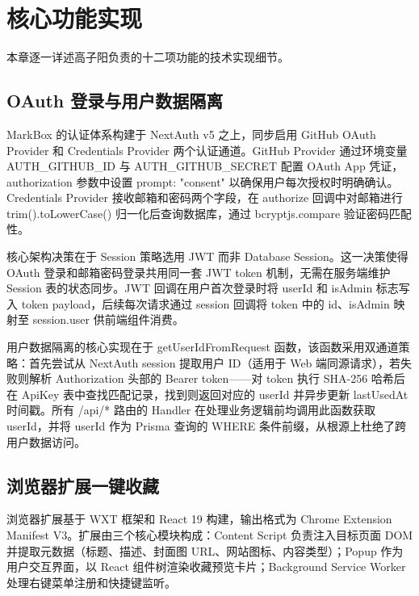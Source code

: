 \documentclass[a4paper,12pt]{ctexart}
\begin{document}
\section{核心功能实现}

本章逐一详述高子阳负责的十二项功能的技术实现细节。

\subsection{OAuth 登录与用户数据隔离}

MarkBox 的认证体系构建于 NextAuth v5 之上，同步启用 GitHub OAuth Provider 和 Credentials Provider 两个认证通道。GitHub Provider 通过环境变量 AUTH\_GITHUB\_ID 与 AUTH\_GITHUB\_SECRET 配置 OAuth App 凭证，authorization 参数中设置 prompt: "consent" 以确保用户每次授权时明确确认。Credentials Provider 接收邮箱和密码两个字段，在 authorize 回调中对邮箱进行 trim().toLowerCase() 归一化后查询数据库，通过 bcryptjs.compare 验证密码匹配性。

核心架构决策在于 Session 策略选用 JWT 而非 Database Session。这一决策使得 OAuth 登录和邮箱密码登录共用同一套 JWT token 机制，无需在服务端维护 Session 表的状态同步。JWT 回调在用户首次登录时将 userId 和 isAdmin 标志写入 token payload，后续每次请求通过 session 回调将 token 中的 id、isAdmin 映射至 session.user 供前端组件消费。

用户数据隔离的核心实现在于 getUserIdFromRequest 函数，该函数采用双通道策略：首先尝试从 NextAuth session 提取用户 ID（适用于 Web 端同源请求），若失败则解析 Authorization 头部的 Bearer token——对 token 执行 SHA-256 哈希后在 ApiKey 表中查找匹配记录，找到则返回对应的 userId 并异步更新 lastUsedAt 时间戳。所有 /api/* 路由的 Handler 在处理业务逻辑前均调用此函数获取 userId，并将 userId 作为 Prisma 查询的 WHERE 条件前缀，从根源上杜绝了跨用户数据访问。


\subsection{浏览器扩展一键收藏}

浏览器扩展基于 WXT 框架和 React 19 构建，输出格式为 Chrome Extension Manifest V3。扩展由三个核心模块构成：Content Script 负责注入目标页面 DOM 并提取元数据（标题、描述、封面图 URL、网站图标、内容类型）；Popup 作为用户交互界面，以 React 组件树渲染收藏预览卡片；Background Service Worker 处理右键菜单注册和快捷键监听。
\end{document}
